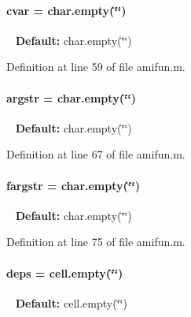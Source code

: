 \hypertarget{classamifun_a716c1ceb8235bc1005b606f777530ede}{}
\paragraph[{cvar}]{\setlength{\rightskip}{0pt plus 5cm}cvar = char.\+empty(\char`\"{}\char`\"{})}\label{classamifun_a716c1ceb8235bc1005b606f777530ede}
~\newline
{\bfseries Default\+:} char.\+empty(\char`\"{}\char`\"{}) 

Definition at line 59 of file amifun.\+m.

\hypertarget{classamifun_aa3914760f4131288b95f0f23d0fdfa6d}{}
\paragraph[{argstr}]{\setlength{\rightskip}{0pt plus 5cm}argstr = char.\+empty(\char`\"{}\char`\"{})}\label{classamifun_aa3914760f4131288b95f0f23d0fdfa6d}
~\newline
{\bfseries Default\+:} char.\+empty(\char`\"{}\char`\"{}) 

Definition at line 67 of file amifun.\+m.

\hypertarget{classamifun_acdb54dfb4e0a737dba0367c5958e779e}{}
\paragraph[{fargstr}]{\setlength{\rightskip}{0pt plus 5cm}fargstr = char.\+empty(\char`\"{}\char`\"{})}\label{classamifun_acdb54dfb4e0a737dba0367c5958e779e}
~\newline
{\bfseries Default\+:} char.\+empty(\char`\"{}\char`\"{}) 

Definition at line 75 of file amifun.\+m.

\hypertarget{classamifun_a69ffe5c24686ceb79ed44399e6be556c}{}
\paragraph[{deps}]{\setlength{\rightskip}{0pt plus 5cm}deps = cell.\+empty(\char`\"{}\char`\"{})}\label{classamifun_a69ffe5c24686ceb79ed44399e6be556c}
~\newline
{\bfseries Default\+:} cell.\+empty(\char`\"{}\char`\"{}) 

